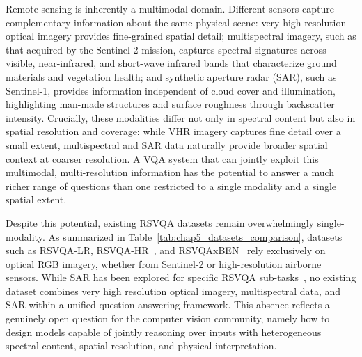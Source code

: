 Remote sensing is inherently a multimodal domain. Different
sensors capture complementary information about the same
physical scene: very high resolution optical imagery
provides fine-grained spatial detail; multispectral imagery,
such as that acquired by the Sentinel-2 mission, captures
spectral signatures across visible, near-infrared, and
short-wave infrared bands that characterize ground materials
and vegetation health; and synthetic aperture radar (SAR),
such as Sentinel-1, provides information independent of
cloud cover and illumination, highlighting man-made
structures and surface roughness through backscatter
intensity. Crucially, these modalities differ not only in
spectral content but also in spatial resolution and
coverage: while VHR imagery captures fine detail over a
small extent, multispectral and SAR data naturally provide
broader spatial context at coarser resolution. A VQA system
that can jointly exploit this multimodal, multi-resolution
information has the potential to answer a much richer range
of questions than one restricted to a single modality and a
single spatial extent.

Despite this potential, existing RSVQA datasets remain
overwhelmingly single-modality. As summarized in
Table~\ref{tab:chap5_datasets_comparison}, datasets such as
RSVQA-LR, RSVQA-HR~\cite{lobry2020rsvqa}, and
RSVQAxBEN~\cite{lobry2021rsvqaben} rely exclusively on
optical RGB imagery, whether from Sentinel-2 or
high-resolution airborne sensors. While SAR has been
explored for specific RSVQA sub-tasks~\cite{tosato2024sar},
no existing dataset combines very high resolution optical
imagery, multispectral data, and SAR within a unified
question-answering framework. This absence reflects a
genuinely open question for the computer vision
community, namely how to design models capable of jointly
reasoning over inputs with heterogeneous spectral content,
spatial resolution, and physical interpretation.

